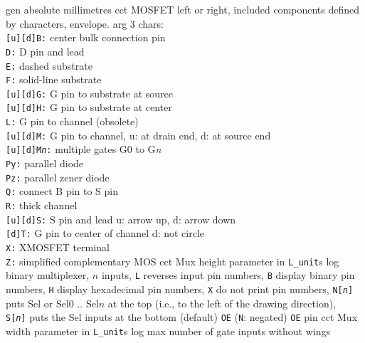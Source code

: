 %
  {gen}%
  {absolute millimetres}%
%
  {cct}%
  {MOSFET left or right, included components defined by characters,
  envelope.
   arg 3 chars:\\
   {\tt [u][d]B:} center bulk connection pin\\
   {\tt D:} D pin and lead\\
   {\tt E:} dashed substrate\\
   {\tt F:} solid-line substrate\\
   {\tt [u][d]G:} G pin to substrate at source\\
   {\tt [u][d]H:} G pin to substrate at center\\
   {\tt L:} G pin to channel (obsolete)\\
   {\tt [u][d]M:} G pin to channel, u: at drain end, d: at source end\\
   {\tt [u][d]M{\sl n}:} multiple gates G0 to G{\sl n}\\
   {\tt Py:} parallel diode\\
   {\tt Pz:} parallel zener diode\\
   {\tt Q:} connect B pin to S pin\\
   {\tt R:} thick channel\\
   {\tt [u][d]S:} S pin and lead u: arrow up, d: arrow down\\
   {\tt [d]T:} G pin to center of channel d: not circle\\
   {\tt X:} XMOSFET terminal\\
   {\tt Z:} simplified complementary MOS
   }%
%
  {cct}%
  {Mux height parameter in {\tt L\_unit}s}%
%
  {log}%
  {binary multiplexer, $n$ inputs,
    {\tt L} reverses input pin numbers, {\tt B} display binary pin
    numbers, {\tt H} display hexadecimal pin numbers, {\tt X} do not
    print pin numbers, {\tt N[{\sl n}]} puts Sel or Sel$0$ .. Sel$n$
    at the top (i.e., to the left of the drawing direction), {\tt
    S[{\sl n}]} puts the Sel inputs at the bottom (default) {\tt OE}%
    ({\tt N}: negated) {\tt OE} pin }%
%
  {cct}%
  {Mux width parameter in {\tt L\_unit}s}%
%
  {log}%
  {max number of gate inputs without wings}%
%
%
%
